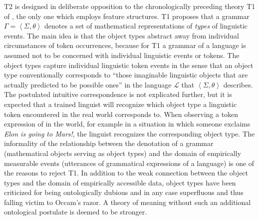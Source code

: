 \documentclass[output=paper
 	        ,biblatex
                ,babelshorthands
                ,newtxmath
                ,draftmode
                ,colorlinks, citecolor=brown
]{langscibook}
\begin{document}
{T2 is designed in deliberate opposition to the chronologically
preceding theory T1 of \citet{PollardSag1994}, the only one which
employs feature structures. T1 proposes that a grammar $\Gamma=\left<
\Sigma, \theta\right>$ denotes a set of mathematical representations
of \emph{types} of linguistic events. The main idea is that the object
types abstract away from individual circumstances of token
occurrences, because for T1 a grammar of a language is assumed not to
be concerned with individual linguistic events or tokens.  The object
types capture individual linguistic token events in the sense that an
object type conventionally corresponds to ``those imaginable linguistic
objects that are actually predicted to be possible ones''
\citep[7]{PollardSag1994} in
the language $\mathcal{L}$ that $\left< \Sigma, \theta\right>$
describes.  The postulated intuitive correspondence is not explicated
further, but it is expected that a trained linguist will recognize
which object type a linguistic token encountered in the real world
corresponds to. When observing a token expression of  in the
world, for example in a situation in which someone exclaims \emph{Elon
  is going to Mars!}, the linguist recognizes the corresponding object
type. The informality of the relationship between the denotation of a
grammar (mathematical objects serving as object types) and the domain
of empirically measurable events (utterances of grammatical expressions
of a language) is one of the reasons to reject T1.  In addition to the
weak connection between the object types and the domain of empirically
accessible data, object types have been criticized for being
ontologically dubious and in any case superfluous and thus falling victim
to Occam's razor. A theory of meaning without such an additional
ontological postulate is deemed to be stronger.



}
\end{document}
